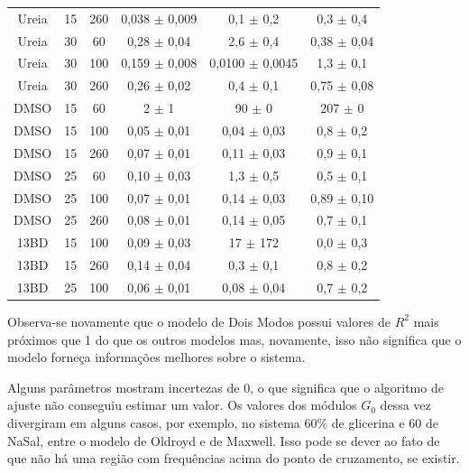 \begin{table}[h]
{\begin{tabular}{c c c c c c}
				  Ureia   & 15      & 260     & 0,038 \(\pm\) 0,009 & 0,1     \(\pm\)     0,2     & 0,3   \(\pm\)   0,4     \\
				  Ureia   & 30      & 60      & 0,28  \(\pm\) 0,04  & 2,6     \(\pm\)     0,4     & 0,38  \(\pm\)  0,04     \\
				  Ureia   & 30      & 100     & 0,159 \(\pm\) 0,008 & 0,0100  \(\pm\)      0,0045 & 1,3   \(\pm\)    0,1     \\
				  Ureia   & 30      & 260     & 0,26  \(\pm\) 0,02  & 0,4     \(\pm\)     0,1     & 0,75  \(\pm\)  0,08     \\ \midrule
				  DMSO    & 15      & 60      & 2  \(\pm\) 1        & 90      \(\pm\)    0        & 207   \(\pm\)        0     \\
				  DMSO    & 15      & 100     & 0,05  \(\pm\) 0,01  & 0,04    \(\pm\) 0,03        & 0,8   \(\pm\)       0,2  \\
				  DMSO    & 15      & 260     & 0,07  \(\pm\) 0,01  & 0,11    \(\pm\) 0,03        & 0,9   \(\pm\)       0,1  \\
				  DMSO    & 25      & 60      & 0,10  \(\pm\) 0,03  & 1,3     \(\pm\)     0,5     & 0,5   \(\pm\)    0,1     \\
				  DMSO    & 25      & 100     & 0,07  \(\pm\) 0,01  & 0,14    \(\pm\) 0,03        & 0,89  \(\pm\)       0,10 \\
				  DMSO    & 25      & 260     & 0,08  \(\pm\) 0,01  & 0,14    \(\pm\) 0,05        & 0,7   \(\pm\)       0,1  \\
				  13BD    & 15      & 100     & 0,09  \(\pm\) 0,03  & 17      \(\pm\)     172     & 0,0   \(\pm\)       0,3  \\
				  13BD    & 15      & 260     & 0,14  \(\pm\) 0,04  & 0,3     \(\pm\)     0,1     & 0,8   \(\pm\)    0,2     \\
				  13BD    & 25      & 100     & 0,06  \(\pm\) 0,01  & 0,08    \(\pm\) 0,04        & 0,7   \(\pm\)       0,2  \\ \bottomrule
			\end{tabular} 
		}{} 
\end{table} 

		\FloatBarrier
		
		Observa-se novamente que o modelo de Dois Modos possui valores de \(R^2\) mais próximos que 1 do que os outros modelos mas, novamente, isso não significa que o modelo forneça informações melhores sobre o sistema.
		
		Alguns parâmetros mostram incertezas de 0, o que significa que o algoritmo de ajuste não conseguiu estimar um valor. Os valores dos módulos \(G_0\) dessa vez divergiram em alguns casos, por exemplo, no sistema 60\% de glicerina e 60 \mM{} de NaSal, entre o modelo de Oldroyd e de Maxwell. Isso pode se dever ao fato de que não há uma região com frequências acima do ponto de cruzamento, se existir.
		
